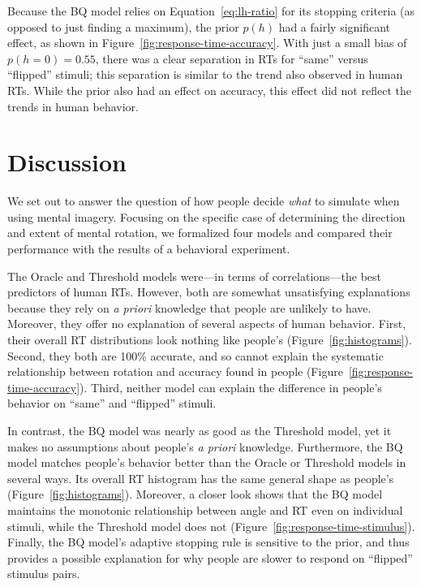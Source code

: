 \documentclass[10pt,letterpaper]{article}
\newcommand{\Oc}[0]{Oracle}
\newcommand{\Th}[0]{Threshold}
\newcommand{\Bq}[0]{BQ}
\begin{document}
Because the \Bq{} model relies on Equation~\ref{eq:lh-ratio} for its
stopping criteria (as opposed to just finding a maximum), the prior
$p(h)$ had a fairly significant effect, as shown in
Figure~\ref{fig:response-time-accuracy}. With just a small bias of
$p(h=0)=0.55$, there was a clear separation in RTs for ``same'' versus
``flipped'' stimuli; this separation is similar to the trend also
observed in human RTs. While the prior also had an effect on accuracy,
this effect did not reflect the trends in human behavior.

\section{Discussion}

We set out to answer the question of how people decide \textit{what}
to simulate when using mental imagery. Focusing on the specific case
of determining the direction and extent of mental rotation, we
formalized four models and compared their performance with the results
of a behavioral experiment.

The \Oc{} and \Th{} models were---in terms of correlations---the best
predictors of human RTs. However, both are somewhat unsatisfying
explanations because they rely on \textit{a priori} knowledge that
people are unlikely to have. Moreover, they offer no explanation of
several aspects of human behavior. First, their overall RT
distributions look nothing like people's
(Figure~\ref{fig:histograms}).  Second, they both are 100\% accurate,
and so cannot explain the systematic relationship between rotation and
accuracy found in people
(Figure~\ref{fig:response-time-accuracy}). Third, neither model can
explain the difference in people's behavior on ``same'' and
``flipped'' stimuli.

In contrast, the \Bq{} model was nearly as good as the \Th{} model,
yet it makes no assumptions about people's \textit{a priori}
knowledge. Furthermore, the \Bq{} model matches people's behavior
better than the \Oc{} or \Th{} models in several ways. Its overall RT
histogram has the same general shape as people's
(Figure~\ref{fig:histograms}).  Moreover, a closer look shows that the
\Bq{} model maintains the monotonic relationship between angle and RT
even on individual stimuli, while the \Th{} model does not
(Figure~\ref{fig:response-time-stimulus}). Finally, the \Bq{} model's
adaptive stopping rule is sensitive to the prior, and thus provides a
possible explanation for why people are slower to respond on
``flipped'' stimulus pairs.
\end{document}
